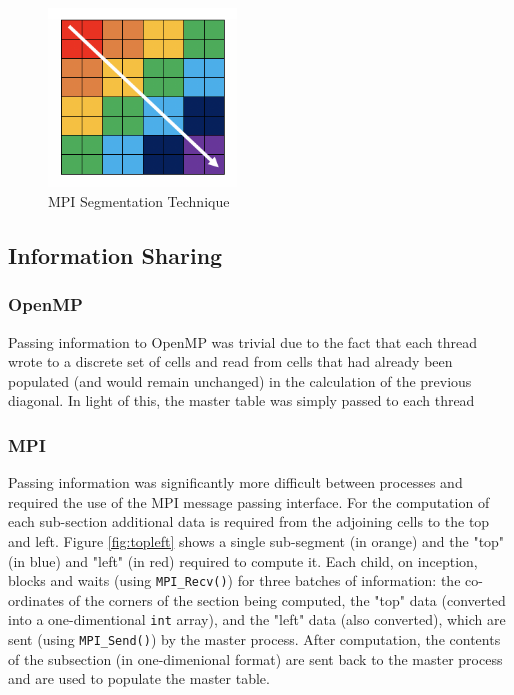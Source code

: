 \begin{figure}[h]
\centering
\includegraphics[width=5cm]{img/segments.png}
\caption{MPI Segmentation Technique}
\label{fig:segmentation}
\end{figure}

\subsection{Information Sharing}
\subsubsection{OpenMP}
Passing information to OpenMP was trivial due to the fact that each thread wrote to a discrete set of cells and read from cells that had already been populated (and would remain unchanged) in the calculation of the previous diagonal. In light of this, the master table was simply passed to each thread

\subsubsection{MPI}
Passing information was significantly more difficult between processes and required the use of the MPI message passing interface. For the computation of each sub-section additional data is required from the adjoining cells to the top and left. Figure \ref{fig:topleft} shows a single sub-segment (in orange) and the "top" (in blue) and "left" (in red) required to compute it. Each child, on inception, blocks and waits (using \lstinline{MPI_Recv()}) for three batches of information: the co-ordinates of the corners of the section being computed, the "top" data (converted into a one-dimentional \lstinline{int} array), and the "left" data (also converted), which are sent (using \lstinline{MPI_Send()}) by the master process. After computation, the contents of the subsection (in one-dimenional format) are sent back to the master process and are used to populate the master table.

